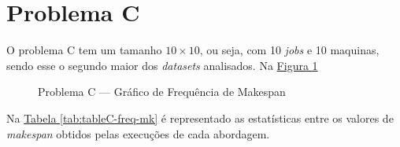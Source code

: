 \section{Problema C}
O problema C tem um tamanho $10 \times 10$, ou seja, com 10 \textit{jobs} e 10 maquinas, 
sendo esse o segundo maior dos \textit{datasets} analisados.
Na \hyperref[fig:plobC-freq-mk]{Figura \ref{fig:plobC-freq-mk}} 
\begin{figure}[!htb]
    \caption{Problema C — Gráfico de Frequência de Makespan}
    \label{fig:plobC-freq-mk}
    \begin{minipage}{.5\linewidth}
        \centering
        \subfloat[]{
            \label{plobC-freq-mk:a}
            \resizebox{\linewidth}{!}{}
        }
    \end{minipage}%
    \begin{minipage}{.5\linewidth}
        \centering
        \subfloat[]{
            \label{plobC-freq-mk:b}
            \resizebox{\linewidth}{!}{}
        }
    \end{minipage}\par\medskip
      \centering
      \subfloat[]{
        \label{plobC-freq-mk:c}
        \resizebox{.5\linewidth}{!}{}
      }
\end{figure}
Na
\hyperref[tab:tableC-freq-mk]{Tabela \ref{tab:tableC-freq-mk}}
é representado as estatísticas entre os valores de \textit{makespan} obtidos pelas execuções de cada abordagem.
